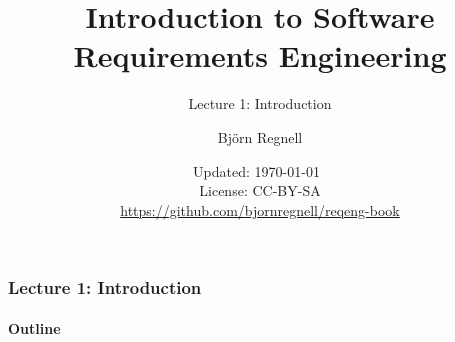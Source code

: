 \documentclass{reqenglecture}
\title{Introduction to Software Requirements Engineering}
\subtitle{Lecture 1: Introduction}
\author{Björn Regnell}
\date{\vspace{1em}\footnotesize Updated: \today~
\\ License: CC-BY-SA 
\\ \url{https://github.com/bjornregnell/reqeng-book} 
}
\begin{document}
\maketitle

\begin{frame}
\frametitle{Lecture 1: Introduction}
\framesubtitle{Outline}
\tableofcontents
\end{frame}



\end{document}
